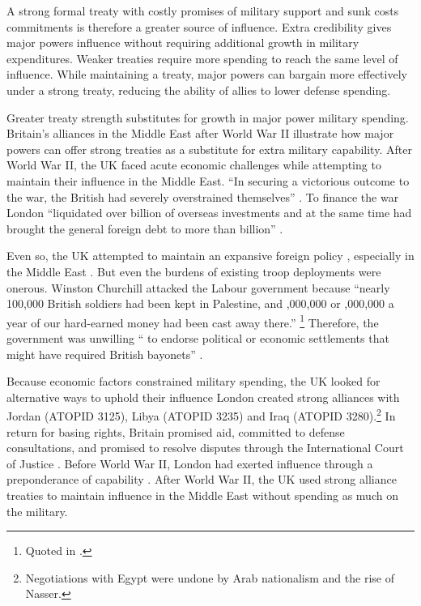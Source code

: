 \documentclass[12pt]{article}
\begin{document}
A strong formal treaty with costly promises of military support and sunk costs commitments is therefore a greater source of influence. 
Extra credibility gives major powers influence without requiring additional growth in military expenditures. 
Weaker treaties require more spending to reach the same level of influence. 
While maintaining a treaty, major powers can bargain more effectively under a strong treaty, reducing the ability of allies to lower defense spending.  


Greater treaty strength substitutes for growth in major power military spending. 
Britain's alliances in the Middle East after World War II illustrate how major powers can offer strong treaties as a substitute for extra military capability. 
After World War II, the UK faced acute economic challenges while attempting to maintain their influence in the Middle East. 
``In securing a victorious outcome to the war, the British had severely overstrained themselves'' \citep[pg. 367]{Kennedy1987}. 
To finance the war London ``liquidated over  billion of overseas investments and at the same time had brought the general foreign debt to more than  billion'' \citep[pg. 12]{Louis1984}.
 

Even so, the UK attempted to maintain an expansive foreign policy \citep{Mayhew1950}, especially in the Middle East \citep{Rahman1982}. 
But even the burdens of existing troop deployments were onerous. 
Winston Churchill attacked the Labour government because ``nearly 100,000 British soldiers had been kept in Palestine, and ,000,000 or ,000,000 a year of our hard-earned money had been cast away there.''
\footnote{Quoted in \citet[pg. 11]{Louis1984}.}
Therefore, the government was unwilling `` to endorse political or economic settlements that might have required British bayonets'' \citep[pg. 15]{Louis1984}. 


Because economic factors constrained military spending, the UK looked for alternative ways to uphold their influence \citep{Monroe1963, Louis1984}
London created strong alliances with Jordan (ATOPID 3125), Libya (ATOPID 3235) and Iraq (ATOPID 3280).\footnote{Negotiations with Egypt were undone by Arab nationalism and the rise of Nasser.} 
In return for basing rights, Britain promised aid, committed to defense consultations, and promised to resolve disputes through the International Court of Justice \citep{Leedsetal2002}. 
Before World War II, London had exerted influence through a preponderance of capability \citep{Monroe1963}.
After World War II, the UK used strong alliance treaties to maintain influence in the Middle East without spending as much on the military. 
\end{document}
